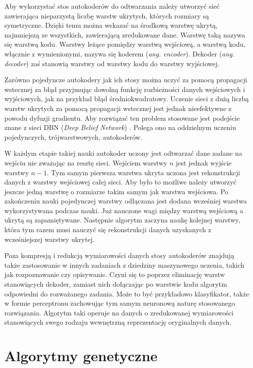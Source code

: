 \documentclass[11pt,a4paper,oneside]{report}
\begin{document}
Aby wykorzystać stos autokoderów do odtwarzania należy utworzyć sieć zawierająca nieparzystą liczbę warstw ukrytych, których rozmiary są symetryczne. Dzięki temu można wskazać na środkową warstwę ukrytą, najmniejszą ze wszystkich, zawierającą zredukowane dane. Warstwę taką nazywa się warstwą kodu. Warstwy leżące pomiędzy warstwą wejściową, a warstwą kodu, włącznie z wymienionymi, nazywa się koderem (\textit{ang. encoder}). Dekoder (\textit{ang. decoder}) zaś stanowią warstwy od warstwy kodu do warstwy wyjściowej.

Zarówno pojedyncze autokodery jak ich stosy można uczyć za pomocą propagacji wstecznej za błąd przyjmując dowolną funkcję rozbieżności danych wejściowych i wyjściowych, jak na przykład błąd średniokwadratowy. Uczenie sieci z dużą liczbą warstw ukrytych za pomocą propagacji wstecznej jest jednak nieefektywne \cite{hinton2006reducing} z powodu dyfuzji gradientu. Aby rozwiązać ten problem stosowane jest podejście znane z sieci DBN (\textit{Deep Belief Network}) \cite{le2008representational}. Polega ono na oddzielnym uczeniu pojedynczych, trójwarstwowych, autokoderów. 

W każdym etapie takiej nauki autokoder uczony jest odtwarzać dane zadane na wejściu nie zważając na resztę sieci. Wejściem warstwy $n$ jest jednak wyjście warstwy $n-1$. Tym samym pierwsza warstwa ukryta uczona jest rekonstrukcji danych z warstwy wejściowej całej sieci. Aby było to możliwe należy utworzyć jeszcze jedną warstwę o rozmiarze takim samym jak warstwa wejściowa. Po zakończeniu nauki pojedynczej warstwy odłączana jest dodana wcześniej warstwa wykorzystywana podczas nauki. Już nauczone wagi między warstwą wejściową a ukrytą są zapamiętywane. Następnie algorytm zaczyna naukę kolejnej warstwy, która tym razem musi nauczyć się rekonstrukcji danych uzyskanych z wcześniejszej warstwy ukrytej.

Poza kompresją i redukcją wymiarowości danych stosy autokoderów znajdują także zastosowanie w innych zadaniach z dziedziny maszynowego uczenia, takich jak rozpoznawanie czy opisywanie. Czyni się to poprzez eliminację warstw stanowiących dekoder, zamiast nich dołączając po warstwie kodu algorytm odpowiedni do rozważanego zadania. Może to być przykładowo klasyfikator, także w formie perceptronu zachowując tym samym neuronową naturę stosowanego rozwiązania. Algorytm taki operuje na danych o zredukowanej wymiarowości stanowiących swego rodzaju wewnętrzną reprezentację oryginalnych danych. 

\section{Algorytmy genetyczne}
\end{document}
